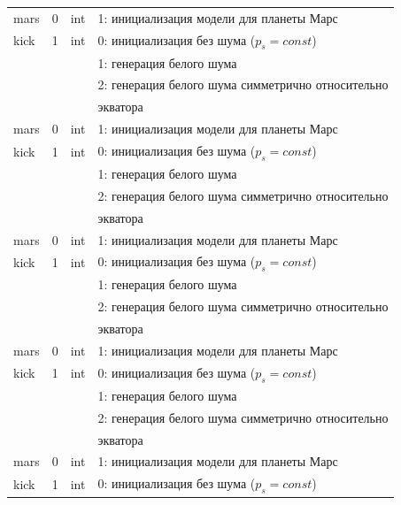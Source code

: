 \begin{longtable}[c]{|l|c|l|l|}
    mars     & 0      & int & 1: инициализация модели для планеты Марс          \\
    kick     & 1      & int & 0: инициализация без шума (\(p_s = const\))       \\
             &        &     & 1: генерация белого шума                          \\
             &        &     & 2: генерация белого шума симметрично относительно \\
             &        &     & экватора                                          \\
    mars     & 0      & int & 1: инициализация модели для планеты Марс          \\
    kick     & 1      & int & 0: инициализация без шума (\(p_s = const\))       \\
             &        &     & 1: генерация белого шума                          \\
             &        &     & 2: генерация белого шума симметрично относительно \\
             &        &     & экватора                                          \\
    mars     & 0      & int & 1: инициализация модели для планеты Марс          \\
    kick     & 1      & int & 0: инициализация без шума (\(p_s = const\))       \\
             &        &     & 1: генерация белого шума                          \\
             &        &     & 2: генерация белого шума симметрично относительно \\
             &        &     & экватора                                          \\
    mars     & 0      & int & 1: инициализация модели для планеты Марс          \\
    kick     & 1      & int & 0: инициализация без шума (\(p_s = const\))       \\
             &        &     & 1: генерация белого шума                          \\
             &        &     & 2: генерация белого шума симметрично относительно \\
             &        &     & экватора                                          \\
    mars     & 0      & int & 1: инициализация модели для планеты Марс          \\
    kick     & 1      & int & 0: инициализация без шума (\(p_s = const\))       \\

\end{longtable}

